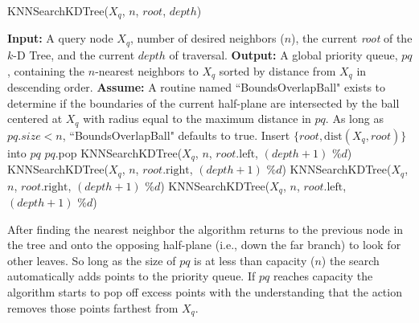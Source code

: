 \documentclass{report}
\begin{document}
\begin{algorithm} 
\caption{KNNSearchKDTree($X_q$, $n$, $root$, $depth$)}         \label{alg:kdtree_knn}  
\begin{algorithmic}[1]    
    \State \textbf{Input:} A query node $X_q$, number of desired neighbors ($n$), the current \emph{root} of the $k$-D Tree, and the current $depth$ of traversal.
    \State \textbf{Output:} A global priority queue, $pq$, containing the $n$-nearest neighbors to $X_q$ sorted by distance from $X_q$ in descending order.
    \State \textbf{Assume:} A routine named ``BoundsOverlapBall" exists to determine if the boundaries of the current half-plane are intersected by the ball centered at $X_q$ with radius equal to the maximum distance in $pq$. As long as $pq.size < n$, ``BoundsOverlapBall" defaults to true. %
    \State
        \State Insert $\{root,\text{dist}(X_q,root)\}$ into $pq$
            \State $pq$.pop 
        \EndIf
        \State \Return
    \EndIf
    \State
        \State KNNSearchKDTree($X_q$, $n$, $root.\text{left}$, $(depth+1) \text{ \% } d$)
    \Else
        \State KNNSearchKDTree($X_q$, $n$, $root.\text{right}$, $(depth+1) \text{ \% } d$)
    \EndIf
    \State 
            \State KNNSearchKDTree($X_q$, $n$, $root.\text{right}$, $(depth+1) \text{ \% } d$)
        \EndIf
    \Else
            \State KNNSearchKDTree($X_q$, $n$, $root.\text{left}$, $(depth+1) \text{ \% } d$)
        \EndIf
    \EndIf
    \State \Return
    \end{algorithmic}
\end{algorithm}

After finding the nearest neighbor the algorithm returns to the previous node in the tree and onto the opposing half-plane (i.e., down the far branch) to look for other leaves. So long as the size of $pq$ is at less than capacity ($n$) the search automatically adds points to the priority queue. If $pq$ reaches capacity the algorithm starts to pop off excess points with the understanding that the action removes those points farthest from $X_q$. 
\end{document}
